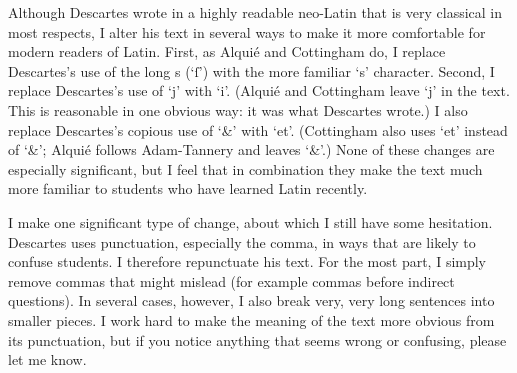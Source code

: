 Although Descartes wrote in a highly readable neo-Latin that is very classical in most respects, I alter his text in several ways to make it more comfortable for modern readers of Latin. First, as Alquié and Cottingham do, I replace Descartes's use of the long s (`ſ') with the more familiar `s' character. Second, I replace Descartes's use of `j' with `i'. (Alquié and Cottingham leave `j' in the text. This is reasonable in one obvious way: it was what Descartes wrote.) I also replace Descartes's copious use of `\&' with `et'. (Cottingham also uses `et' instead of `\&'; Alquié follows Adam-Tannery and leaves `\&'.) None of these changes are especially significant, but I feel that in combination they make the text much more familiar to students who have learned Latin recently.

I make one significant type of change, about which I still have some hesitation. Descartes uses punctuation, especially the comma, in ways that are likely to confuse students. I therefore repunctuate his text. For the most part, I simply remove commas that might mislead (for example commas before indirect questions). In several cases, however, I also break very, very long sentences into smaller pieces. I work hard to make the meaning of the text more obvious from its punctuation, but if you notice anything that seems wrong or confusing, please let me know.
